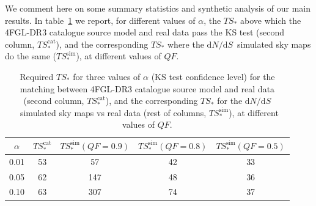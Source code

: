 \documentclass{article}
\def\dNdS{\textrm{d}N/\textrm{d}S}
\begin{document}
We comment here on some summary statistics and synthetic analysis of our main results.
%
In table~\ref{tab:tsstar} we report, for different values of $\alpha$, the 
$TS_*$ above which the 4FGL-DR3 catalogue source model and real data pass the KS test (second column, $TS_*^\textrm{cat}$), and the corresponding $TS_*$ where the $\dNdS$~simulated sky maps do the same ($TS_*^\textrm{sim}$), at different values of $QF$.
\begin{table}[!h]
    \renewcommand{\arraystretch}{1.2}
    \centering
    \begin{tabular}{c|c|c|c|c}   
        $\alpha$ & $TS_*^\textrm{cat}$ & $TS_*^\textrm{sim}(QF=0.9)$& $TS_*^\textrm{sim}(QF=0.8)$&  $TS_*^\textrm{sim}(QF=0.5)$\\
        \hline 
       0.01 & 53 & 57 & 42 & 33\\ 
        \hline 
       0.05 & 62 & 147 & 48 & 36\\ 
        \hline 
       0.10 & 63 & 307 & 74 & 37\\
    \end{tabular}
\caption{Required $TS_*$ for three values of $\alpha$ (KS test confidence level) for the matching between 4FGL-DR3 catalogue source model and real data (second column, $TS_*^\textrm{cat}$), and the corresponding $TS_*$ for the $\dNdS$~simulated sky maps vs real data (rest of columns, $TS_*^\textrm{sim}$), at different values of $QF$.}  
\label{tab:tsstar}
\end{table}
\end{document}
